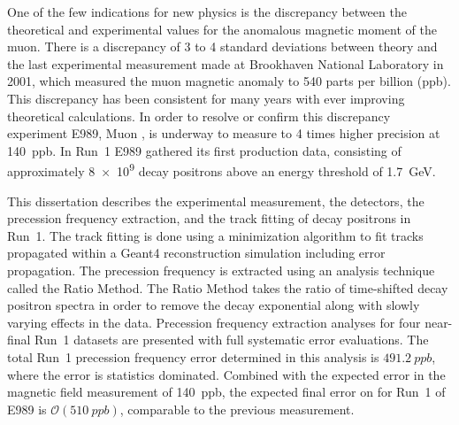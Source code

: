 


One of the few indications for new physics is the discrepancy between the theoretical and experimental values for the anomalous magnetic moment of the muon. There is a discrepancy of 3 to 4 standard deviations between theory and the last experimental measurement made at Brookhaven National Laboratory in 2001, which measured the muon magnetic anomaly \amu to 540 parts per billion (ppb). This discrepancy has been consistent for many years with ever improving theoretical calculations. In order to resolve or confirm this discrepancy experiment E989, Muon \gmtwo, is underway to measure \amu to 4 times higher precision at \SI{140}{ppb}. In Run~1 E989 gathered its first production data, consisting of approximately \SI{8e9}{} decay positrons above an energy threshold of \SI{1.7}{\GeV}.

This dissertation describes the experimental measurement, the detectors, the precession frequency extraction, and the track fitting of decay positrons in Run~1. The track fitting is done using a \chisq minimization algorithm to fit tracks propagated within a Geant4 reconstruction simulation including error propagation. The precession frequency is extracted using an analysis technique called the Ratio Method. The Ratio Method takes the ratio of time-shifted decay positron spectra in order to remove the decay exponential along with slowly varying effects in the data. Precession frequency extraction analyses for four near-final Run~1 datasets are presented with full systematic error evaluations. The total Run~1 precession frequency error determined in this analysis is $\SI{491.2}{ppb}$, where the error is statistics dominated. Combined with the expected error in the magnetic field measurement of \SI{140}{ppb}, the expected final error on \amu for Run~1 of E989 is $\mathcal{O}(\SI{510}{ppb})$, comparable to the previous measurement.






